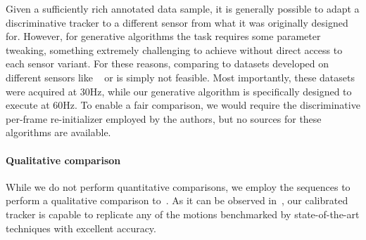 Given a sufficiently rich annotated data sample, it is generally possible to adapt a discriminative tracker to a different sensor from what it was originally designed for. However, for generative algorithms the task requires some parameter tweaking, something extremely challenging to achieve without direct access to each sensor variant. For these reasons, comparing to datasets developed on different sensors like \dexter{}~\cite{sridhar2013multicam} or \fingerpaint{} \cite{sharp2015accurate} is simply not feasible. Most importantly, these datasets were acquired at 30Hz, while our generative algorithm is specifically designed to execute at 60Hz. To enable a fair comparison, we would require the discriminative per-frame re-initializer employed by the authors, but no sources for these algorithms are available.

\paragraph{Qualitative comparison}
While we do not perform quantitative comparisons, we employ the \handy{} sequences to perform a qualitative comparison to~\cite{qian2014realtime,sridhar2015fast,sharp2015accurate,taylor2016concerto}. As it can be observed in~\VideoExtra{}, our calibrated tracker is capable to replicate any of the motions benchmarked by state-of-the-art techniques with excellent accuracy.


